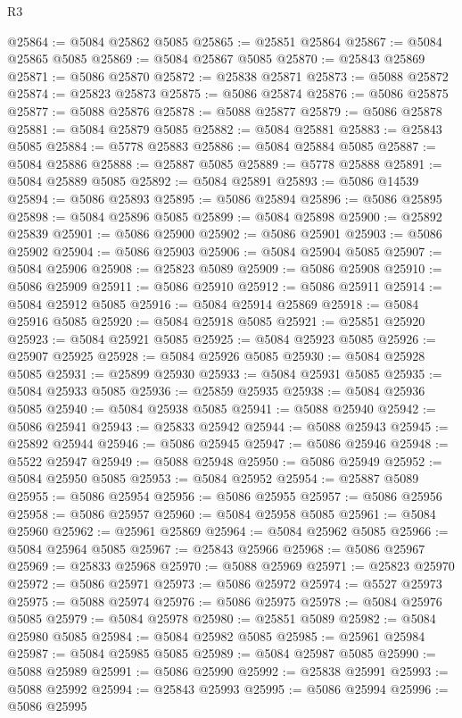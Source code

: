\begin{lexlean}{R3}
\begin{coremodule}
@25864 := @5084 @25862 @5085
@25865 := @25851 @25864
@25867 := @5084 @25865 @5085
@25869 := @5084 @25867 @5085
@25870 := @25843 @25869
@25871 := @5086 @25870
@25872 := @25838 @25871
@25873 := @5088 @25872
@25874 := @25823 @25873
@25875 := @5086 @25874
@25876 := @5086 @25875
@25877 := @5088 @25876
@25878 := @5088 @25877
@25879 := @5086 @25878
@25881 := @5084 @25879 @5085
@25882 := @5084 @25881
@25883 := @25843 @5085
@25884 := @5778 @25883
@25886 := @5084 @25884 @5085
@25887 := @5084 @25886
@25888 := @25887 @5085
@25889 := @5778 @25888
@25891 := @5084 @25889 @5085
@25892 := @5084 @25891
@25893 := @5086 @14539
@25894 := @5086 @25893
@25895 := @5086 @25894
@25896 := @5086 @25895
@25898 := @5084 @25896 @5085
@25899 := @5084 @25898
@25900 := @25892 @25839
@25901 := @5086 @25900
@25902 := @5086 @25901
@25903 := @5086 @25902
@25904 := @5086 @25903
@25906 := @5084 @25904 @5085
@25907 := @5084 @25906
@25908 := @25823 @5089
@25909 := @5086 @25908
@25910 := @5086 @25909
@25911 := @5086 @25910
@25912 := @5086 @25911
@25914 := @5084 @25912 @5085
@25916 := @5084 @25914 @25869
@25918 := @5084 @25916 @5085
@25920 := @5084 @25918 @5085
@25921 := @25851 @25920
@25923 := @5084 @25921 @5085
@25925 := @5084 @25923 @5085
@25926 := @25907 @25925
@25928 := @5084 @25926 @5085
@25930 := @5084 @25928 @5085
@25931 := @25899 @25930
@25933 := @5084 @25931 @5085
@25935 := @5084 @25933 @5085
@25936 := @25859 @25935
@25938 := @5084 @25936 @5085
@25940 := @5084 @25938 @5085
@25941 := @5088 @25940
@25942 := @5086 @25941
@25943 := @25833 @25942
@25944 := @5088 @25943
@25945 := @25892 @25944
@25946 := @5086 @25945
@25947 := @5086 @25946
@25948 := @5522 @25947
@25949 := @5088 @25948
@25950 := @5086 @25949
@25952 := @5084 @25950 @5085
@25953 := @5084 @25952
@25954 := @25887 @5089
@25955 := @5086 @25954
@25956 := @5086 @25955
@25957 := @5086 @25956
@25958 := @5086 @25957
@25960 := @5084 @25958 @5085
@25961 := @5084 @25960
@25962 := @25961 @25869
@25964 := @5084 @25962 @5085
@25966 := @5084 @25964 @5085
@25967 := @25843 @25966
@25968 := @5086 @25967
@25969 := @25833 @25968
@25970 := @5088 @25969
@25971 := @25823 @25970
@25972 := @5086 @25971
@25973 := @5086 @25972
@25974 := @5527 @25973
@25975 := @5088 @25974
@25976 := @5086 @25975
@25978 := @5084 @25976 @5085
@25979 := @5084 @25978
@25980 := @25851 @5089
@25982 := @5084 @25980 @5085
@25984 := @5084 @25982 @5085
@25985 := @25961 @25984
@25987 := @5084 @25985 @5085
@25989 := @5084 @25987 @5085
@25990 := @5088 @25989
@25991 := @5086 @25990
@25992 := @25838 @25991
@25993 := @5088 @25992
@25994 := @25843 @25993
@25995 := @5086 @25994
@25996 := @5086 @25995

\end{coremodule}
\end{lexlean}
